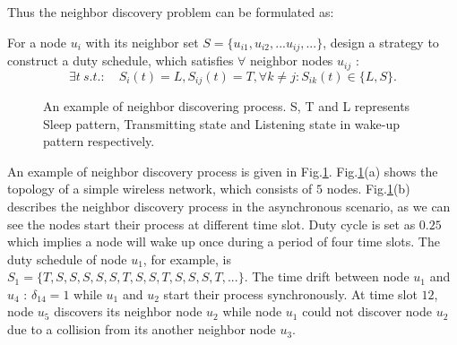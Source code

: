 Thus the neighbor discovery problem can be formulated as:
\begin{problem}
For a node $u_i$ with its neighbor set $S = \{u_{i1},u_{i2},...u_{ij},...\}$, 
design a strategy to construct a duty schedule, which satisfies
$\forall$ neighbor nodes $u_{ij}$ :
$$
\exists t \ s.t. :  \quad
S_i(t) = L ,
S_{ij}(t) = T,
\forall k \neq j : S_{ik}(t) \in \{L, S\}.
$$

\end{problem}

\begin{figure}[!h]
\centering
{}
\vspace{0.03in}
\caption{An example of neighbor discovering process. S, T and L represents Sleep pattern, 
Transmitting state and Listening state in wake-up pattern respectively.}
\label{NDexample}
\end{figure}

An example of neighbor discovery process is given in Fig.\ref{NDexample}. 
Fig.\ref{NDexample}(a) shows the topology of a simple
wireless network, which consists of $5$ nodes. 
Fig.\ref{NDexample}(b) describes the neighbor discovery process 
in the asynchronous scenario, as we can see the nodes 
start their process at different time slot. 
Duty cycle is set as $0.25$ which implies a node will wake up 
once during a period of four time slots. The duty schedule of 
node $u_1$, for example, is $S_1 = \{ T, S, S, S, S, S, T, S, S, T, S, S, S, T, ... \}$.
The time drift between node $u_1$ and $u_4$ : $\delta_{14} = 1$ while $u_1$ and $u_2$ start their process synchronously.
At time slot $12$, node $u_5$ discovers its neighbor node $u_2$ while node $u_1$ 
could not discover node $u_2$ due to a collision from its another neighbor node $u_3$. 



